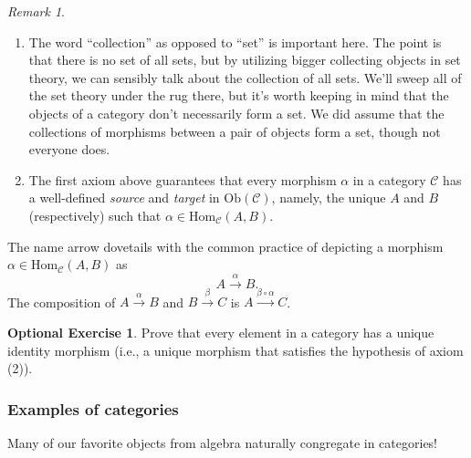 \documentclass{amsart}[12pt]
\newcommand{\Hom}{\mathrm{Hom}}
\def\sC{\mathscr C}
\newcommand{\DEF}[1]{\emph{#1}\index{#1}}
\numberwithin{equation}{section}
\theoremstyle{plain} %
\theoremstyle{definition}
\newtheorem{exer}[equation]{Optional Exercise}
\theoremstyle{remark}
\newtheorem{rem}[equation]{Remark}
\newcommand{\sssec}[1]{\subsubsection{#1}}
\newcommand{\xra}[1]{\xrightarrow{#1}}
\newcommand{\Ob}{\mathrm{Ob}}
\begin{document}
\begin{rem}
\begin{enumerate}
\item The word ``collection'' as opposed to ``set'' is important here. The point is that there is no set of all sets, but by utilizing bigger collecting objects in set theory, we can sensibly talk about the collection of all sets. We'll sweep all of the set theory under the rug there, but it's worth keeping in mind that the objects of a category don't necessarily form a set. We did assume that the collections of morphisms between a pair of objects  form a set, though not everyone does. 
\item The first axiom above guarantees that every morphism $\alpha$ in a category $\sC$ has a well-defined \DEF{source} and \DEF{target} in $\Ob(\sC)$, namely, the unique $A$ and $B$ (respectively) such that ${\alpha\in \Hom_{\sC}(A,B)}$.
\end{enumerate}
\end{rem}

The name arrow dovetails with the common practice of depicting a morphism $\alpha\in \Hom_{\sC}(A,B)$ as
\[ A \stackrel{\alpha}{\longrightarrow} B.\]
The composition of $A \xra{\alpha} B$ and $B\xra{\beta} C$ is $A\xra{\beta \circ \alpha} C$.

\begin{exer} Prove that every element in a category has a unique identity morphism (i.e., a unique morphism that satisfies the hypothesis of axiom (2)).
\end{exer}

\sssec{Examples of categories}

Many of our favorite objects from algebra naturally congregate in categories!
\end{document}
